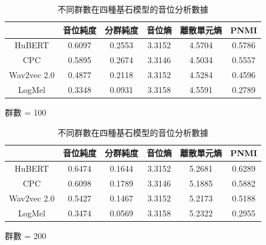 {{\begin{table}[!htbp]
    \vspace{0.5cm}

    \begin{subtable}[t]{\textwidth}
        \centering
        \begin{tabular}{|c|c|c|c|c|c|} \hline
                        & 音位純度   & 分群純度   & 音位熵    & 離散單元熵  & PNMI   \\ \hline
            HuBERT      &     0.6097 &     0.2553 &    3.3152 &      4.5704 & 0.5786 \\ \hline    %
            CPC         &     0.5895 &     0.2674 &    3.3146 &      4.5034 & 0.5557 \\ \hline    %
            Wav2vec 2.0 &     0.4877 &     0.2118 &    3.3152 &      4.5284 & 0.4596 \\ \hline    %
            LogMel      &     0.3348 &     0.0931 &    3.3158 &      4.5591 & 0.2789 \\ \hline    %
        \end{tabular}
        \caption{群數 = 100}
        \label{tab:ch3-clu100-phn}
    \end{subtable}

    \vspace{0.5cm}

    \begin{subtable}[t]{\textwidth}
        \centering
        \begin{tabular}{|c|c|c|c|c|c|} \hline
                        & 音位純度   & 分群純度   & 音位熵    & 離散單元熵  & PNMI   \\ \hline
            HuBERT      &     0.6474 &     0.1644 &    3.3152 &      5.2681 & 0.6289 \\ \hline    %
            CPC         &     0.6098 &     0.1789 &    3.3146 &      5.1885 & 0.5882 \\ \hline    %
            Wav2vec 2.0 &     0.5427 &     0.1467 &    3.3152 &      5.2173 & 0.5188 \\ \hline    %
            LogMel      &     0.3474 &     0.0569 &    3.3158 &      5.2322 & 0.2955 \\ \hline    %
        \end{tabular}
        \caption{群數 = 200}
        \label{tab:ch3-clu200-phn}
    \end{subtable}

    \caption{不同群數在四種基石模型的音位分析數據}
    \label{tab:single-cluster-results}
\end{table}

}}
